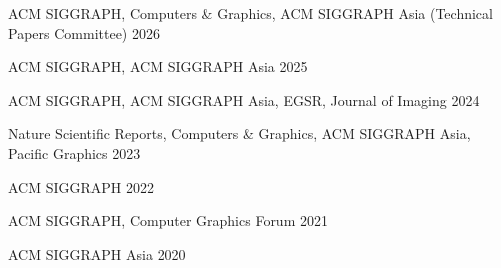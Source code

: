 
\begin{cvhonors}
    \cvhonor
	{ACM SIGGRAPH, Computers \& Graphics, ACM SIGGRAPH Asia (Technical Papers Committee)}
	{}
	{}
	{2026}

    \cvhonor
	{ACM SIGGRAPH, ACM SIGGRAPH Asia}
	{}
	{}
	{2025}
	
    \cvhonor
	{ACM SIGGRAPH, ACM SIGGRAPH Asia, EGSR, Journal of Imaging}
	{}
	{}
	{2024}
	
	
    \cvhonor
	{Nature Scientific Reports, Computers \& Graphics, ACM SIGGRAPH Asia, Pacific Graphics}
	{}
	{}
	{2023}

    \cvhonor
	{ACM SIGGRAPH}
	{}
	{}
	{2022}
	
    \cvhonor
	{ACM SIGGRAPH, Computer Graphics Forum}
	{}
	{}
	{2021}
	
	\cvhonor
	{ACM SIGGRAPH Asia}
	{}
	{}
	{2020}

	
\end{cvhonors}

